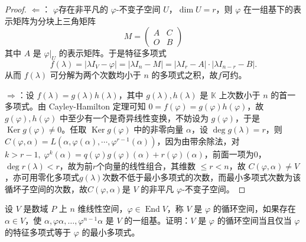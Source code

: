 \documentclass[lang=cn,12pt]{elegantbook}
\begin{document}
\begin{proof}
    \(\Leftarrow\)： $\varphi$存在非平凡的 \(\varphi\)-不变子空间 \(U\)，\(\dim U = r\)，则 \(\varphi\) 在一组基下的表示矩阵为分块上三角矩阵
    \[
    M = 
    \begin{pmatrix}
    A & C \\
    O & B
    \end{pmatrix}
    \]
    其中 \(A\) 是 \(\varphi|_U\) 的表示矩阵。于是特征多项式
    \[
    f(\lambda) = |\lambda I_V - \varphi| = |\lambda I_n - M| = |\lambda I_r - A| \cdot |\lambda I_{n-r} - B|.
    \]
    从而 \(f(\lambda)\) 可分解为两个次数均小于 \(n\) 的多项式之积，故$f$可约。

     \(\Rightarrow\)：设 \(f(\lambda) = g(\lambda)h(\lambda)\)，其中 \(g(\lambda), h(\lambda)\) 是 \(\mathbb{K}\) 上次数小于 \(n\) 的首一多项式。由 Cayley-Hamilton 定理可知 \(0 = f(\varphi) = g(\varphi)h(\varphi)\)，故 \(g(\varphi), h(\varphi)\) 中至少有一个是奇异线性变换，不妨设为 \(g(\varphi)\)，于是 \(\operatorname{Ker} g(\varphi) \neq 0\)。任取 \(\operatorname{Ker} g(\varphi)\) 中的非零向量 \(\alpha\)，设 \(\deg g(\lambda) = r\)，则 \(C(\varphi, \alpha) = L(\alpha, \varphi(\alpha), \cdots, \varphi^{r-1}(\alpha))\)，因为由带余除法，对$k >r-1,\; \varphi^k(\alpha) = q(\varphi)g(\varphi)(\alpha) + r(\varphi)(\alpha)$，前面一项为0，$\deg r(\lambda) < r $，故为前$r$个向量的线性组合，其维数 \(\leq r < n\)，故 \(C(\varphi, \alpha) \neq V\)，亦可用零化多项式$g(\lambda) $次数不低于最小多项式的次数，而最小多项式次数为该循坏子空间的次数，故$C(\varphi, \alpha)$是 \(V\) 的非平凡 \(\varphi\)-不变子空间。
\end{proof}

\begin{example}
    设 \(V\) 是数域 \(P\) 上 \(n\) 维线性空间，\(\varphi \in \operatorname{End}V\)，称 \(V\) 是 \(\varphi\) 的循环空间，如果存在 \(\alpha \in V\)，使 \(\alpha, \varphi\alpha, \ldots, \varphi^{n-1}\alpha\) 是 \(V\) 的一组基。证明：\(V\) 是 \(\varphi\) 的循环空间当且仅当 \(\varphi\) 的特征多项式等于 \(\varphi\) 的最小多项式。
\end{example}
\end{document}
